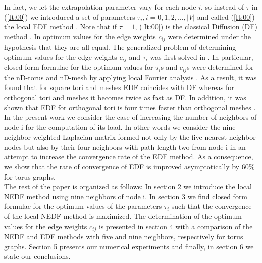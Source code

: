 \documentclass{report}
\begin{document}
In fact, we let the extrapolation parameter vary for each node $i$, so
instead of $\tau $ in (\ref{It:00})
we introduced a set of parameters $\tau _i, i=0,1,2, \dots,|V| $ and called (\ref{It:00})
the local EDF method \cite{Kara04,MarkoMiss10}. Note that if $\tau=1$,
(\ref{It:00}) is the classical Diffusion (DF) method
\cite{Cybe89,Boil90}. In \cite{Xu97} optimum values for the edge weights
$c_{ij}$ were determined under the hypothesis that they are all equal.
The generalized problem of determining optimum values for the edge
weights $c_{ij}$ and $\tau_{i}$ was first solved in \cite{Kara04}. In
particular, closed form formulae for the optimum values for $\tau _i$s
and $c_{ij}$s were determined for the nD-torus \cite{Kara04} and nD-mesh
\cite{MarkoMiss10}
by applying local Fourier analysis \cite{Bra77}. As a result, it was
found that for square tori and meshes EDF coincides with DF whereas for
orthogonal tori and meshes it becomes twice as fast as DF.
In addition, it was shown that EDF for orthogonal tori is four times
faster than orthogonal meshes \cite{MarkoMiss10}.
\\In the present work we consider the case of increasing the number of
neighbors of node i for the computation of its load.
In other words we consider the nine neighbor weighted Laplacian matrix
formed not only by the five nearest neighbor nodes but also by their four
neighbors with path length two from node i in an attempt to increase the
convergence rate of the EDF method. As a consequence, we show that the
rate of convergence of EDF is improved asymptotically by $60\%$ for torus
graphs.
\\ The rest of the paper is organized as follows: In section 2 we
introduce the local NEDF method using nine neighbors of node i. In
section 3 we find closed form formulae for the optimum values of the
parameters $\tau_i$ such that the convergence of the local NEDF method is
maximized. The determination of the optimum values for the edge weights
$c_{ij}$ is presented in section 4 with a comparison of the NEDF and EDF
methods with five and nine neighbors, respectively for torus graphs.
Section 5 presents our numerical experiments and finally, in section 6 we
state our conclusions.
\noindent
\end{document}
